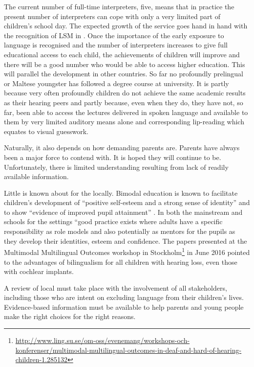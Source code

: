 \documentclass[output=paper]{langsci/langscibook}
\begin{document}
The current number of full-time  interpreters, five,
means that in practice the present number of interpreters can cope
with only a very limited part of  children’s school day.  The
expected growth of the service goes hand in hand with the recognition
of LSM in . Once the importance of the early exposure to 
language is recognised and the number of  interpreters
increases to give full educational access to each  child, the
achievements of  children will improve and there will be a good
number who would be able to access higher education. This will
parallel the development in other countries. So far no profoundly
prelingual  or  Maltese youngster has followed a degree course
at university.  It is partly because very often profoundly 
children do not achieve the same academic results as their hearing
peers and partly because, even when they do, they have not, so far,
been able to access the lectures delivered in spoken language and
available to them by very limited auditory means alone and
corresponding lip-reading which equates to visual guesswork.

Naturally, it also depends on how demanding parents are.  Parents have
always been a major force to contend with.  It is hoped they will
continue to be.  Unfortunately, there is limited understanding
resulting from lack of readily available information.

Little is known about  for the 
locally. Bimodal  education is known to facilitate 
children’s development of “positive self-esteem and a strong sense of
identity” and to show “evidence of improved pupil attainment”
\citep[19]{sg07}.  In both the mainstream and
schools for the  settings “good practice exists where  adults
have a specific responsibility as role models and also potentially as
mentors for the  pupils as they develop their identities, esteem
and confidence. The papers presented at the Multimodal Multilingual
Outcomes workshop in
Stockholm\footnote{\url{http://www.ling.su.se/om-oss/evenemang/workshops-och-konferenser/multimodal-multilingual-outcomes-in-deaf-and-hard-of-hearing-children-1.285132}}
in June 2016 pointed to the advantages of  bilingualism
for all children with hearing loss, even those with cochlear implants.

A review of local  must take place with the involvement
of all stakeholders, including those who are intent on excluding 
language from their  children’s lives.  Evidence-based information
must be available to help parents and young people make the right
choices for the right reasons.
\end{document}
